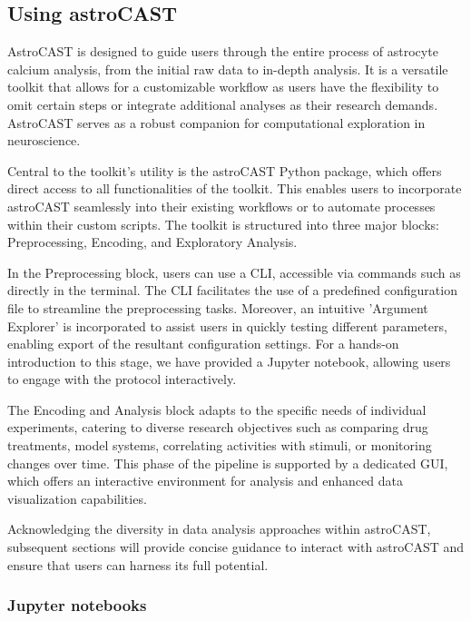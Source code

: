 
\subsection{Using astroCAST}

AstroCAST is designed to guide users through the entire process of astrocyte calcium analysis, from the initial raw data to in-depth analysis. It is a versatile toolkit that allows for a customizable workflow as users have the flexibility to omit certain steps or integrate additional analyses as their research demands. AstroCAST serves as a robust companion for computational exploration in neuroscience.

Central to the toolkit's utility is the astroCAST Python package, which offers direct access to all functionalities of the toolkit. This enables users to incorporate astroCAST seamlessly into their existing workflows or to automate processes within their custom scripts. The toolkit is structured into three major blocks: Preprocessing, Encoding, and Exploratory Analysis.

In the Preprocessing block, users can use a \ac{CLI}, accessible via commands such as  directly in the terminal. The \ac{CLI} facilitates the use of a predefined configuration file to streamline the preprocessing tasks. Moreover, an intuitive 'Argument Explorer' is incorporated to assist users in quickly testing different parameters, enabling export of the resultant configuration settings. For a hands-on introduction to this stage, we have provided a Jupyter notebook, allowing users to engage with the protocol interactively.

The Encoding and Analysis block adapts to the specific needs of individual experiments, catering to diverse research objectives such as comparing drug treatments, model systems, correlating activities with stimuli, or monitoring changes over time. This phase of the pipeline is supported by a dedicated \ac{GUI}, which offers an interactive environment for analysis and enhanced data visualization capabilities.

Acknowledging the diversity in data analysis approaches within \ac{astroCAST}, subsequent sections will provide concise guidance to interact with astroCAST and ensure that users can harness its full potential.

\subsubsection{Jupyter notebooks}

